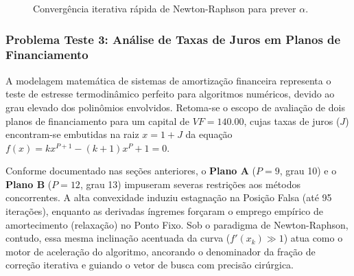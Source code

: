 \begin{figure}[H]
    \centering
    \caption{Convergência iterativa rápida de Newton-Raphson para prever $\alpha$.}
    \label{fig:convergencia_newton_missil}
\end{figure}

\subsubsection{Problema Teste 3: Análise de Taxas de Juros em Planos de Financiamento}
\label{subsubsec:problema_teste_3_newton_raphson}

A modelagem matemática de sistemas de amortização financeira representa o teste de estresse termodinâmico perfeito para algoritmos numéricos, devido ao grau elevado dos polinômios envolvidos. Retoma-se o escopo de avaliação de dois planos de financiamento para um capital de $VF = 140.00$, cujas taxas de juros ($J$) encontram-se embutidas na raiz $x = 1+J$ da equação $f(x) = kx^{P+1} - (k+1)x^P + 1 = 0$.

Conforme documentado nas seções anteriores, o \textbf{Plano A} ($P=9$, grau 10) e o \textbf{Plano B} ($P=12$, grau 13) impuseram severas restrições aos métodos concorrentes. A alta convexidade induziu estagnação na Posição Falsa (até 95 iterações), enquanto as derivadas íngremes forçaram o emprego empírico de amortecimento (relaxação) no Ponto Fixo. Sob o paradigma de Newton-Raphson, contudo, essa mesma inclinação acentuada da curva ($f'(x_k) \gg 1$) atua como o motor de aceleração do algoritmo, ancorando o denominador da fração de correção iterativa e guiando o vetor de busca com precisão cirúrgica.

